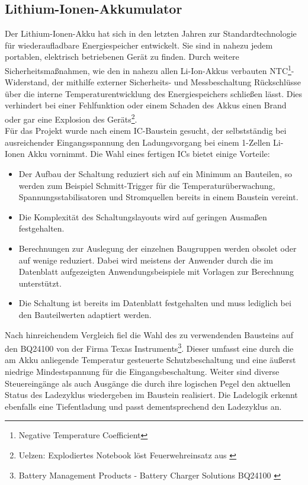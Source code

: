 \documentclass[12pt]{scrreprt} %
\begin{document}
\subsection{Lithium-Ionen-Akkumulator}
\label{chap:4.2.2}
 Der Lithium-Ionen-Akku hat sich in den letzten Jahren zur Standardtechnologie für wiederaufladbare Energiespeicher entwickelt. Sie sind in nahezu jedem portablen, elektrisch betriebenen Gerät zu finden. Durch weitere Sicherheitsmaßnahmen, wie den in nahezu allen Li-Ion-Akkus verbauten NTC\footnote{Negative Temperature Coefficient}-Widerstand, der mithilfe externer Sicherheits- und Messbeschaltung Rückschlüsse über die interne Temperaturentwicklung des Energiespeichers schließen lässt. Dies verhindert bei einer Fehlfunktion oder einem Schaden des Akkus einen Brand oder gar eine Explosion des Geräts\footnote{Uelzen: Explodiertes Notebook löst Feuerwehreinsatz aus \citep{tonline}}. \\
Für das Projekt wurde nach einem IC-Baustein gesucht, der selbstständig bei ausreichender Eingangsspannung den Ladungsvorgang bei einem 1-Zellen Li-Ionen Akku vornimmt. Die Wahl eines fertigen ICs bietet einige Vorteile:
\begin{itemize}
\item
Der Aufbau der Schaltung reduziert sich auf ein Minimum an Bauteilen, so werden zum Beispiel Schmitt-Trigger für die Temperaturüberwachung, Spannungsstabilisatoren und Stromquellen bereits in einem Baustein vereint. 
\item
Die Komplexität des Schaltungslayouts wird auf geringen Ausmaßen festgehalten.
\item
Berechnungen zur Auslegung der einzelnen Baugruppen werden obsolet oder auf wenige reduziert. Dabei wird meistens der Anwender durch die im Datenblatt aufgezeigten Anwendungsbeispiele mit Vorlagen zur Berechnung unterstützt.
\item
Die Schaltung ist bereits im Datenblatt festgehalten und muss lediglich bei den Bauteilwerten adaptiert werden.
\end{itemize}
Nach hinreichendem Vergleich fiel die Wahl des zu verwendenden Bausteins auf den BQ24100 von der Firma Texas Instruments\footnote{Battery Management Products - Battery Charger Solutions BQ24100 \citep{TIBQ24100}}. Dieser umfasst eine durch die am Akku anliegende Temperatur gesteuerte Schutzbeschaltung und eine äußerst niedrige Mindestspannung für die Eingangsbeschaltung. Weiter sind diverse Steuereingänge als auch Ausgänge die durch ihre logischen Pegel den aktuellen Status des Ladezyklus wiedergeben im Baustein realisiert. Die Ladelogik erkennt ebenfalls eine Tiefentladung und passt dementsprechend den Ladezyklus an. \\
\end{document}
